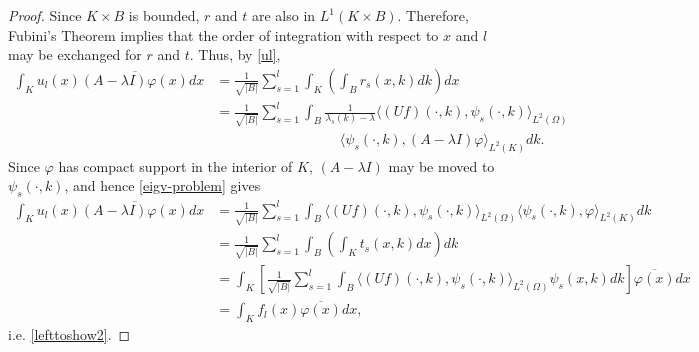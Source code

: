 {\begin{theorem}
\begin{proof}
		Since $K \times B$ is bounded, $r$ and $t$ are also in $L^{1}(K \times B)$. Therefore, Fubini’s Theorem implies that the order of integration with respect to $x$ and $l$ may be exchanged for $r$ and $t$. Thus, by \eqref{ul},
			\begin{align*}
				\int_{K} u_{l}(x) \overline{(A - \lambda I) \varphi(x)} dx & = \frac{1}{\sqrt{|B|}} \sum_{s=1}^{l} \int_{K} \left( \int_{B} r_{s}(x, k) dk \right) dx \\
					& = \frac{1}{\sqrt{|B|}} \sum_{s=1}^{l} \int_{B} \frac{1}{\lambda_{s}(k) - \lambda} \langle (Uf)(\cdot, k), \psi_{s}(\cdot, k) \rangle_{L^{2}(\Omega)} \\
					& ~\qquad ~\qquad ~\qquad ~\qquad \langle \psi_{s}(\cdot, k), (A - \lambda I) \varphi \rangle_{L^{2}(K)} dk. 
			\end{align*}
			Since $\varphi$ has compact support in the interior of $K$, $(A - \lambda I)$ may be moved to $\psi_{s}(\cdot, k)$, and hence \eqref{eigv-problem} gives
			\begin{align*}
				\int_{K} u_{l}(x) \overline{(A - \lambda I) \varphi(x)} dx					& = \frac{1}{\sqrt{|B|}} \sum_{s=1}^{l} \int_{B} \langle (Uf)(\cdot, k), \psi_{s}(\cdot, k) \rangle_{L^{2}(\Omega)} \langle \psi_{s}(\cdot, k), \varphi \rangle_{L^{2}(K)} dk \\
				 	& = \frac{1}{\sqrt{|B|}} \sum_{s=1}^{l} \int_{B} \left( \int_{K} t_{s}(x, k) dx \right) dk \\
					& = \int_{K} \left[ \frac{1}{\sqrt{|B|}} \sum_{s=1}^{l} \int_{B} \langle (Uf)(\cdot, k), \psi_{s}(\cdot, k) \rangle_{L^{2}(\Omega)} \psi_{s}(x, k) dk \right] \overline{\varphi(x)} dx \\
					& = \int_{K} f_{l}(x) \overline{\varphi(x)} dx,
			\end{align*}
			i.e. \eqref{lefttoshow2}.
	\end{proof}
\end{theorem}
}